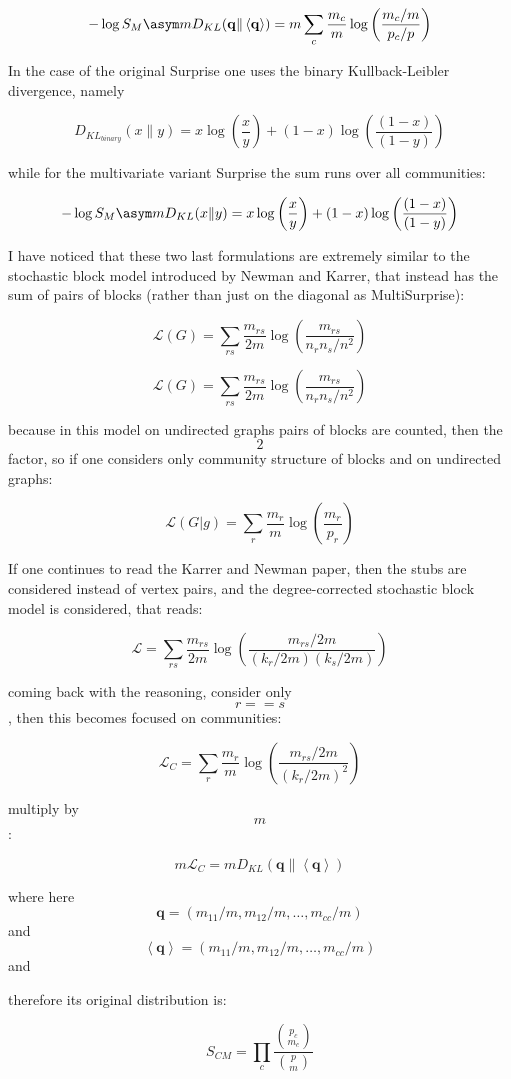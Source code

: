 \[ -\log{S_M} \asym m D_{KL}(\mathbf{q} \| \left< \mathbf{q}\right>) = m \sum_c \dfrac{m_c}{m} \log\left(\dfrac{m_c/m}{p_c/p} \right)\]

In the case of the original Surprise one uses the binary
Kullback-Leibler divergence, namely

\[D_{KL}_{binary}(x \| y) = x \log \left(\frac{x}{y}\right) + (1-x)\log\left(\frac{(1-x)}{(1-y)}\right)\]

while for the multivariate variant Surprise the sum runs over all
communities:

\[-\log{S_M} \asym m D_{KL}(x \| y) = x \log \left(\frac{x}{y}\right) + (1-x)\log\left(\frac{(1-x)}{(1-y)}\right)\]

I have noticed that these two last formulations are extremely similar to
the stochastic block model introduced by Newman and Karrer, that instead
has the sum of pairs of blocks (rather than just on the diagonal as
MultiSurprise):

\[\mathcal{L}(G) = \sum \limits_{rs} \dfrac{m_{rs}}{2m}\log\left( \dfrac{m_{rs}}{n_r n_s/n^2}\right)\]

\[\mathcal{L}(G) = \sum \limits_{rs} \dfrac{m_{rs}}{2m}\log\left( \dfrac{m_{rs}}{n_r n_s/n^2}\right)\]

because in this model on undirected graphs pairs of blocks are counted,
then the \[2\] factor, so if one considers only community structure of
blocks and on undirected graphs:

\[\mathcal{L}(G | g) = \sum \limits_{r} \dfrac{m_{r}}{m}\log\left( \dfrac{m_{r}}{p_r}\right)\]

If one continues to read the Karrer and Newman paper, then the stubs are
considered instead of vertex pairs, and the degree-corrected stochastic
block model is considered, that reads:

\[
\mathcal{L} = \sum \limits_{rs} \dfrac{m_{rs}}{2m} \log \left( \dfrac{m_{rs}/2m}{(k_r/2m)(k_s/2m)}\right)
\]

coming back with the reasoning, consider only \[r==s\], then this
becomes focused on communities:

\[
\mathcal{L}_C = \sum \limits_{r} \dfrac{m_{r}}{m} \log \left( \dfrac{m_{rs}/2m}{(k_r/2m)^2}\right)
\]

multiply by \[m\]:

\[
m \mathcal{L}_C = mD_{KL}(\mathbf{q} \| \left< \mathbf{q}\right>)
\]

where here \[\mathbf{q}=(m_{11}/m, m_{12}/m, \ldots, m_{cc}/m)\] and
\[\left< \mathbf{q} \right >=(m_{11}/m, m_{12}/m, \ldots, m_{cc}/m)\]
and

therefore its original distribution is:

\[S_{CM} = \prod \limits_c \dfrac{\binom{p_c}{m_c}}{\binom{p}{m}}\]
